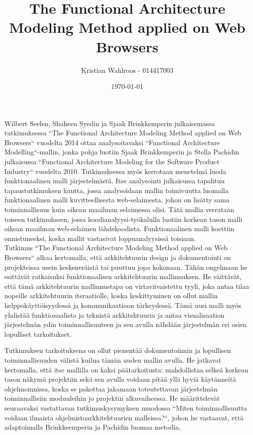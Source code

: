 \documentclass[finnish]{tktltiki2}
\title{The Functional Architecture Modeling Method applied on Web Browsers}
\author{Kristian Wahlroos - 014417003}
\date{\today}
\theoremstyle{definition}
\theoremstyle{remark}
\begin{document}

\frontmatter      %

\maketitle        %



\mainmatter       %


Wilbert Seelen, Shaheen Syedin ja Sjaak Brinkkemperin julkaisemassa tutkimuksessa ``The Functional Architecture Modeling Method applied on Web Browsers`` vuodelta 2014 ottaa analysoitavaksi ``Functional Architecture Modelling``-mallin, jonka pohja luotiin Sjaak Brinkkemperin ja Stella Pachidin julkaisussa ``Functional Architecture Modeling for the Software Product Industry`` vuodelta 2010. Tutkimuksessa myös kerrotaan menetelmä luoda funktionaalinen malli järjestelmästä. Itse analysointi julkaisussa tapahtuu tapaustutkimuksen kautta, jossa analysoidaan mallin toimivuutta luomalla funktionaalinen malli kuvitteellisesta web-selaimesta, johon on lisätty sama toiminnallisuus kuin oikean maailman selaimessa olisi. Tätä mallia verrataan toiseen tutkimukseen, jossa koodianalyysi-työkalulla luotiin korkean tason malli oikean maailman web-selaimen lähdekoodista. Funktionaalinen malli koettiin onnistuneeksi, koska mallit vastasivat loppuanalyysissä toisiaan.\\

Tutkimus ``The Functional Architecture Modeling Method applied on Web Browsers`` alkaa kertomalla, että arkkitehtuurin design ja dokumentointi on projekteissa usein keskeneräistä tai puuttuu jopa kokonaan. Tähän ongelmaan he esittävät ratkaisuksi funktionaalisen arkkitehtuurin mallinnuksen. He väittävät, että tämä arkkitehtuurin mallinnustapa on virtaviivaistettu tyyli, joka antaa tilaa nopeille arkkitehtuurin iteraatiolle, koska keskittyminen on ollut mallin helppokäyttöisyydessä ja kommunikaatioon tärkeydessä. Tämä uusi malli myös yhdistää funktionaalista ja teknistä arkkitehtuuria ja antaa visualisaation järjestelmän ydin toiminnallisuuteen ja sen avulla nähdään järjestelmän eri osien lopulliset tarkoitukset.  

Tutkimuksen tarkoituksena on ollut pienentää dokumentoinnin ja lopullisen toiminnallisuuden välistä kuilua tämän uuden mallin avulla. He jatkavat kertomalla, että itse mallilla on kaksi päätarkoitusta: mahdollistaa selkeä korkean tason näkymä projektiin sekä sen avulla voidaan pitää yllä hyviä käytänneitä ohjelmoinnissa, koska se pakottaa jakamaan toteutettavan järjestelmän toiminnallisiin moduuleihin jo projektin alkuvaiheessa. He määrittelevät seuraavaksi vastattavan tutkimuskysymyksen muodossa ``Miten toiminnallisuutta voidaan ilmaista ohjelmistoarkkitehtuurien malleissa?``, johon he vastaavat, että adaptoimalla Brinkkeemperin ja Pachidin luomaa metodia. 
\end{document}
